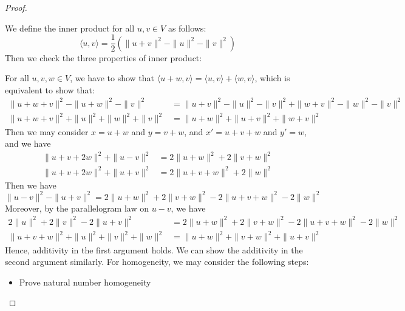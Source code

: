 \begin{proof}
\begin{description}[labelwidth=\widthof{\bfseries ($\Rightarrow$):~}]
		\item[($\Leftarrow$)] We define the inner product for all $u, v \in V$ as follows:
		      \[
			      \langle u, v \rangle = \frac{1}{2} \left( \| u + v \|^2 - \| u \|^2 - \| v \|^2 \right)
		      \]
		      Then we check the three properties of inner product:
		      \begin{description}[labelwidth=\widthof{\bfseries Positive-definiteness:~}]
			      \item[Bilinearity] For all $u, v, w \in V$, we have to show that $\langle u + w, v \rangle = \langle u, v \rangle + \langle w, v \rangle$, which is equivalent to show that:
			            \begin{align*}
				            \| u + w + v \|^2 - \| u + w \|^2 - \| v \|^2         & = \| u + v \|^2 - \| u \|^2 - \| v \|^2 + \| w + v \|^2 - \| w \|^2 - \| v \|^2 \\
				            \| u + w + v \|^2 + \| u \|^2 + \| w \|^2 + \| v \|^2 & = \| u + w \|^2 + \| u + v \|^2 + \| w + v \|^2
			            \end{align*}
			            Then we may consider $x = u + w$ and $y = v + w$, and $x' = u + v + w$ and $y' = w$, and we have
			            \begin{align*}
				            \| u + v + 2w \|^2 + \| u - v \|^2 & = 2 \| u + w \|^2 + 2 \| v + w \|^2 \\
				            \| u + v + 2w \|^2 + \| u + v \|^2 & = 2 \| u + v + w \|^2 + 2 \| w \|^2
			            \end{align*}
			            Then we have
			            \[
				            \| u - v \|^2 - \| u + v \|^2 = 2 \| u + w \|^2 + 2 \| v + w \|^2 - 2 \| u + v + w \|^2 - 2 \| w \|^2
			            \]
			            Moreover, by the parallelogram law on $u - v$, we have
			            \begin{align*}
				            2 \| u \|^2 + 2 \| v \|^2 - 2 \| u + v \|^2           & = 2 \| u + w \|^2 + 2 \| v + w \|^2 - 2 \| u + v + w \|^2 - 2 \| w \|^2 \\
				            \| u + v + w \|^2 + \| u \|^2 + \| v \|^2 + \| w \|^2 & = \| u + w \|^2 + \| v + w \|^2 + \| u + v \|^2
			            \end{align*}
			            Hence, additivity in the first argument holds. We can show the additivity in the second argument similarly. For homogeneity, we may consider the following steps:
			            \begin{itemize}
				            \item Prove natural number homogeneity

\end{itemize}
\end{description}
\end{description}
\end{proof}
